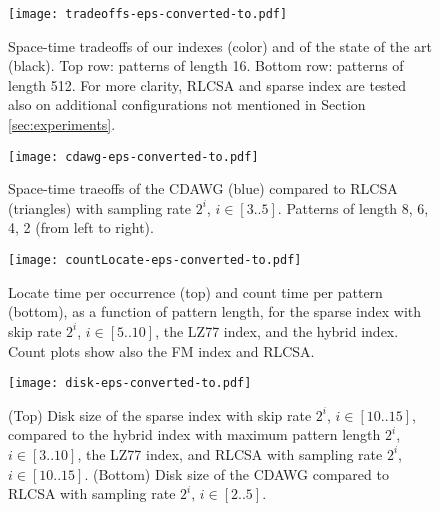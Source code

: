 \documentclass[a4paper,UKenglish]{lipics-v2016}
\begin{document}
\begin{figure}
\begin{center}
\texttt{[image: tradeoffs-eps-converted-to.pdf]}
\caption{Space-time tradeoffs of our indexes (color) and of the state of the art (black). Top row: patterns of length 16. Bottom row: patterns of length 512. For more clarity, RLCSA and sparse index are tested also on additional configurations not mentioned in Section \ref{sec:experiments}.
\label{fig:tradeoffs}
}
\end{center}
\end{figure}

\begin{figure}
\begin{center}
\texttt{[image: cdawg-eps-converted-to.pdf]}
\caption{Space-time traeoffs of the CDAWG (blue) compared to RLCSA (triangles) with sampling rate $2^i$, $i \in [3..5]$. Patterns of length 8, 6, 4, 2 (from left to right).
\label{fig:cdawg}
}
\end{center}
\end{figure}



\begin{figure}
\begin{center}
\texttt{[image: countLocate-eps-converted-to.pdf]}
\caption{Locate time per occurrence (top) and count time per pattern (bottom), as a function of pattern length, for the sparse index with skip rate $2^i$, $i \in [5..10]$, the LZ77 index, and the hybrid index. Count plots show also the FM index and RLCSA.
\label{fig:countLocate}
}
\end{center}
\end{figure}

\begin{figure}
\begin{center}
\texttt{[image: disk-eps-converted-to.pdf]}
\caption{(Top) Disk size of the sparse index with skip rate $2^i$, $i \in [10..15]$, compared to the hybrid index with maximum pattern length $2^i$, $i \in [3..10]$, the LZ77 index, and RLCSA with sampling rate $2^i$, $i \in [10..15]$. (Bottom) Disk size of the CDAWG compared to RLCSA with sampling rate $2^i$, $i \in [2..5]$.
\label{fig:disk}
}
\end{center}
\end{figure}
\end{document}
